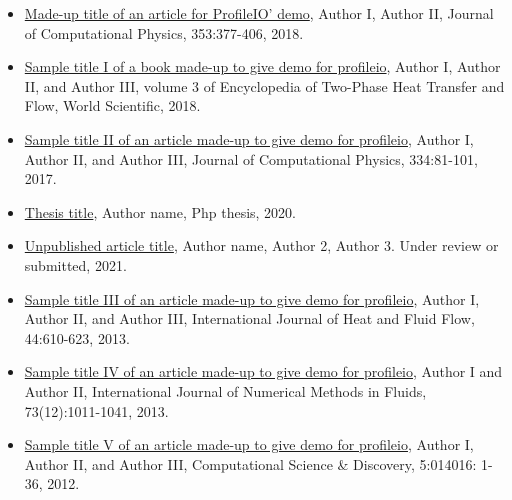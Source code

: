 \documentclass{res}
\begin{document}
\begin{resume}
\begin{itemize}[leftmargin=\parindent]
	\item[] \href{https://www.sciencedirect.com/science/article/pii/S0021999117307696}{Made-up title of an article for ProfileIO' demo}, Author I, Author II, Journal of Computational Physics, 353:377-406, 2018.
	\item[] \href{https://www.worldscientific.com/doi/abs/10.1142/9789813229440_0008}{Sample title I of a book made-up to give demo for profileio}, Author I, Author II, and Author III, volume 3 of Encyclopedia of Two-Phase Heat Transfer and Flow, World Scientific, 2018.
	\item[] \href{https://www.sciencedirect.com/science/article/pii/S0021999116307045}{Sample title II of an article made-up to give demo for profileio}, Author I, Author II, and Author III, Journal of Computational Physics, 334:81-101, 2017.
	\item[] \href{https://www.sciencedirect.com/science/article/pii/S0021999116307045}{Thesis title}, Author name, Php thesis, 2020.
	\item[] \href{https://www.sciencedirect.com/science/article/pii/S0021999116307045}{Unpublished article title}, Author name, Author 2, Author 3. Under review or submitted, 2021.
	\item[] \href{https://www.sciencedirect.com/science/article/pii/S0142727X13001707}{Sample title III of an article made-up to give demo for profileio}, Author I, Author II, and Author III, International Journal of Heat and Fluid Flow, 44:610-623, 2013.
	\item[] \href{http://onlinelibrary.wiley.com/doi/10.1002/fld.3834/abstract}{Sample title IV of an article made-up to give demo for profileio}, Author I and Author II, International Journal of Numerical Methods in Fluids, 73(12):1011-1041, 2013.
	\item[] \href{http://iopscience.iop.org/1749-4699/5/1/014016}{Sample title V of an article made-up to give demo for profileio}, Author I, Author II, and Author III, Computational Science \& Discovery, 5:014016: 1-36, 2012.
	\end{itemize}
	

\end{resume}
\end{document}
